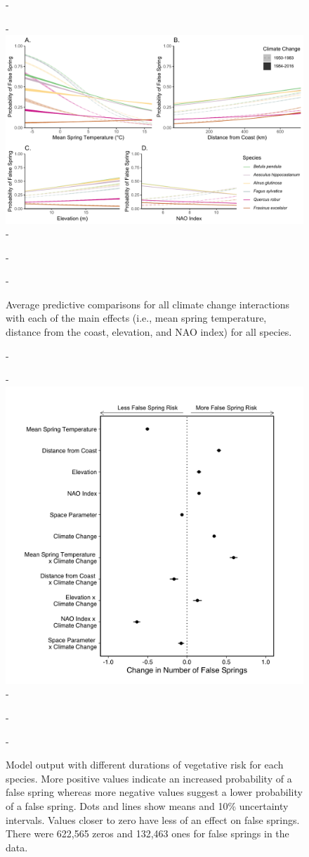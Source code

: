 \documentclass{article}\usepackage[]{graphicx}\usepackage[]{color}
\begin{document}
{{\begin{figure} [H]
  -\begin{center}
  -\includegraphics[width=16cm]{..//analyses/figures/APC_allpred_allspp_baseR.pdf}
  -\caption{Average predictive comparisons for all climate change interactions with each of the main effects (i.e., mean spring temperature, distance from the coast, elevation, and NAO index) for all species. }\label{fig:suppapc}
  -\end{center}
  -\end{figure}}
  
  {\begin{figure} [H]
  -\begin{center}
  -\includegraphics[width=12cm]{..//analyses/figures/model_output_90_dvr.png}
  -\caption{Model output with different durations of vegetative risk for each species. More positive values indicate an increased probability of a false spring whereas more negative values suggest a lower probability of a false spring. Dots and lines show means and 10\% uncertainty intervals. Values closer to zero have less of an effect on false springs. There were 622,565 zeros and 132,463 ones for false springs in the data.}\label{fig:dvr}
  -\end{center}
  -\end{figure}}
  
}
\end{document}
